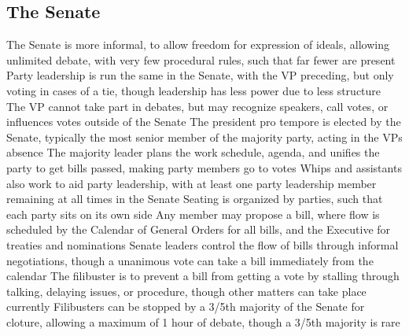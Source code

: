 \documentclass[11 pt, twoside]{article}
\newenvironment{outline*}
{
	\begin{outline}[enumerate]
	}
	{\end{outline}
}
\begin{document}
\subsection{The Senate}
\begin{outline*}
\1 The Senate is more informal, to allow freedom for expression of ideals, allowing unlimited debate, with very few procedural rules, such that far fewer are present
\1 Party leadership is run the same in the Senate, with the VP preceding, but only voting in cases of a tie, though leadership has less power due to less structure
\2 The VP cannot take part in debates, but may recognize speakers, call votes, or influences votes outside of the Senate
\2 The president pro tempore is elected by the Senate, typically the most senior member of the majority party, acting in the VPs absence
\2 The majority leader plans the work schedule, agenda, and unifies the party to get bills passed, making party members go to votes
\2 Whips and assistants also work to aid party leadership, with at least one party leadership member remaining at all times in the Senate
\2 Seating is organized by parties, such that each party sits on its own side
\1 Any member may propose a bill, where flow is scheduled by the Calendar of General Orders for all bills, and the Executive for treaties and nominations
\2 Senate leaders control the flow of bills through informal negotiations, though a unanimous vote can take a bill immediately from the calendar
\1 The filibuster is to prevent a bill from getting a vote by stalling through talking, delaying issues, or procedure, though other matters can take place currently
\2 Filibusters can be stopped by a 3/5th majority of the Senate for cloture, allowing a maximum of 1 hour of debate, though a 3/5th majority is rare
\end{outline*}
\end{document}
